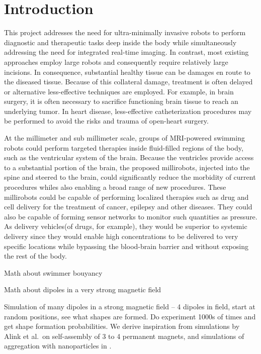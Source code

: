 \section{Introduction}\label{sec:Intro}
%
 
This project addresses the need for ultra-minimally invasive robots to perform diagnostic and therapeutic tasks deep inside the body while simultaneously addressing the need for integrated real-time imaging. In contrast, most existing approaches employ large robots and consequently require relatively large incisions.  In consequence, substantial healthy tissue can be damages en route to the diseased tissue.  Because of this collateral damage, treatment is often delayed or alternative less-effective techniques are employed.  For example, in brain surgery, it is often necessary to sacrifice functioning brain tissue to reach an underlying tumor.  In  heart disease, less-effective catheterization procedures may be performed to avoid the risks and trauma of open-heart surgery. 
 
 At the millimeter and sub millimeter scale, groups of MRI-powered swimming robots could perform targeted therapies inside fluid-filled regions of the body, such as the ventricular system of the brain.  Because the ventricles provide access to a substantial portion of the brain, the proposed millirobots, injected into the spine and steered to the brain, could significantly reduce the morbidity of current procedures whiles also enabling a broad range of new procedures.  These millirobots could be capable of performing localized therapies such as drug and cell delivery for the treatment of cancer, epilepsy and other diseases.  They could also be capable of forming sensor networks to monitor such quantities as pressure.  As delivery vehicles(of drugs, for example), they would be superior to systemic delivery since they would enable high concentrations to be delivered to very specific locations while bypassing the blood-brain barrier and without exposing the rest of the body.
 
 
 
 
 Math about swimmer bouyancy
 
 Math about dipoles in a very strong magnetic field \cite{thomaszewski2008magnets}
 
 Simulation of many dipoles in a strong magnetic field
 -- 4 dipoles in field, start at random positions, see what shapes are formed.  Do experiment 1000s of times and get shape formation probabilities.
We derive inspiration from simulations by Alink et al.~on self-assembly of 3 to 4 permanent magnets\cite{alink2011simulating}, and simulations of aggregation with nanoparticles in \cite{vartholomeos2010simulation}.
 

